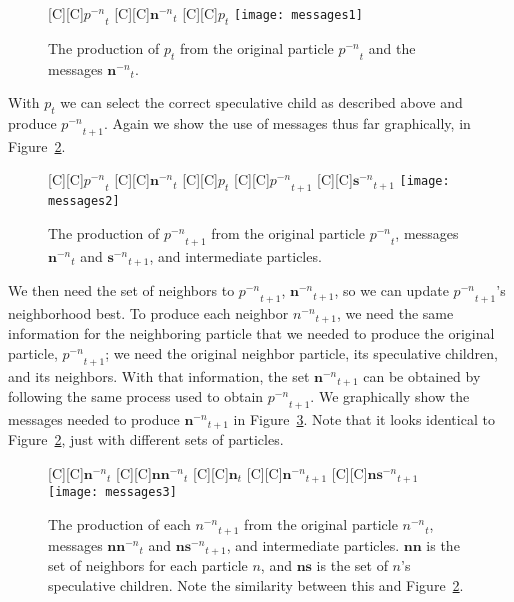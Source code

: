 \documentclass[smallcondensed]{svjour3}
\newcommand{\fig}[1]{Figure~\ref{fig:#1}}
\providecommand{\nonbest}[1]{\ensuremath{#1^{-n}}}
\providecommand{\p}{\ensuremath{p}}
\providecommand{\sset}{\ensuremath{\mathbf{s}}}
\providecommand{\nsset}{\ensuremath{\mathbf{ns}}}
\providecommand{\n}{\ensuremath{n}}
\providecommand{\nset}{\ensuremath{\mathbf{n}}}
\providecommand{\nnset}{\ensuremath{\mathbf{nn}}}
\begin{document}
\begin{figure}
  \centering
  [C][C]{$\nonbest{\p}_{t}$}
  [C][C]{$\nonbest{\nset}_{t}$}
  [C][C]{$\p_{t}$}
  \texttt{[image: messages1]}
  \caption{The production of $\p_{t}$ from the original particle
  $\nonbest{\p}_{t}$ and the messages $\nonbest{\nset}_{t}$.}
  \label{fig:messages1}
\end{figure}

With $\p_t$ we can select the correct speculative child as described above and
produce $\nonbest{\p}_{t+1}$.  Again we show the use of messages thus far
graphically, in \fig{messages2}.  

\begin{figure}
  \centering
  [C][C]{$\nonbest{\p}_{t}$}
  [C][C]{$\nonbest{\nset}_{t}$}
  [C][C]{$\p_{t}$}
  [C][C]{$\nonbest{\p}_{t+1}$}
  [C][C]{$\nonbest{\sset}_{t+1}$}
  \texttt{[image: messages2]}
  \caption{The production of $\nonbest{\p}_{t+1}$ from the original particle 
  $\nonbest{\p}_{t}$, messages $\nonbest{\nset}_{t}$ and
  $\nonbest{\sset}_{t+1}$, and intermediate particles.}
  \label{fig:messages2}
\end{figure}

We then need the set of neighbors to $\nonbest{\p}_{t+1}$,
$\nonbest{\nset}_{t+1}$, so we can update $\nonbest{\p}_{t+1}$'s neighborhood
best.  To produce each neighbor $\nonbest{\n}_{t+1}$, we need the same
information for the neighboring particle that we needed to produce the original
particle, $\nonbest{\p}_{t+1}$; we need the original neighbor particle, its
speculative children, and its neighbors.  With that information, the set
$\nonbest{\nset}_{t+1}$ can be obtained by following the same process used to
obtain $\nonbest{\p}_{t+1}$.  We graphically show the messages needed to
produce $\nonbest{\nset}_{t+1}$ in \fig{messages3}.  Note that it looks
identical to \fig{messages2}, just with different sets of particles.

\begin{figure}
  \centering
  [C][C]{$\nonbest{\nset}_{t}$}
  [C][C]{$\nonbest{\nnset}_{t}$}
  [C][C]{$\nset_{t}$}
  [C][C]{$\nonbest{\nset}_{t+1}$}
  [C][C]{$\nonbest{\nsset}_{t+1}$}
  \texttt{[image: messages3]}
  \caption{The production of each $\nonbest{\n}_{t+1}$ from the original
  particle $\nonbest{\n}_{t}$, messages $\nonbest{\nnset}_{t}$ and
  $\nonbest{\nsset}_{t+1}$, and intermediate particles.  $\nnset$ is the set of
  neighbors for each particle $\n$, and $\nsset$ is the set of $\n$'s
  speculative children.  Note the similarity between this and \fig{messages2}.}
  \label{fig:messages3}
\end{figure}
\end{document}
